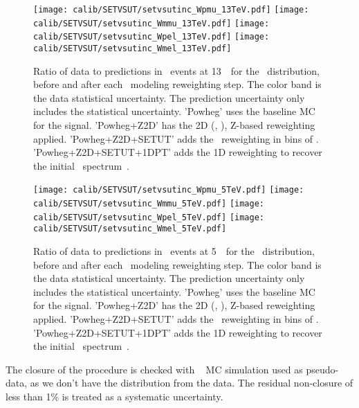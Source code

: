      
     \begin{figure}[pt]
     	\texttt{[image: calib/SETVSUT/setvsutinc\_Wpmu\_13TeV.pdf]}%
     	\texttt{[image: calib/SETVSUT/setvsutinc\_Wmmu\_13TeV.pdf]}
		\texttt{[image: calib/SETVSUT/setvsutinc\_Wpel\_13TeV.pdf]}%
     	\texttt{[image: calib/SETVSUT/setvsutinc\_Wmel\_13TeV.pdf]}
     	\caption{Ratio of data to predictions in
     		\Wmn\ events at 13~\TeV\ for the \setue\ distribution, before and after each \setue\ modeling reweighting step. The color band is the data statistical uncertainty. The prediction uncertainty only includes the statistical uncertainty. 'Powheg' uses the baseline MC for the signal. 'Powheg+Z2D' has the 2D (\setue, \pttruthv), Z-based reweighting applied. 'Powheg+Z2D+SETUT' adds the \setue\ reweighting in bins of \ut. 'Powheg+Z2D+SETUT+1DPT' adds the 1D reweighting to recover the initial \pttruthv\ spectrum~\cite{int_note_hr}.}
     	\label{fig:setCalibDataMCRatio13}
     \end{figure}
     
     
     \begin{figure}[pt]
     	\texttt{[image: calib/SETVSUT/setvsutinc\_Wpmu\_5TeV.pdf]}%
		\texttt{[image: calib/SETVSUT/setvsutinc\_Wmmu\_5TeV.pdf]}
		\texttt{[image: calib/SETVSUT/setvsutinc\_Wpel\_5TeV.pdf]}%
		\texttt{[image: calib/SETVSUT/setvsutinc\_Wmel\_5TeV.pdf]}
     	\caption{Ratio of data to predictions in
     		\Wmn\ events at 5~\TeV\ for the \setue\ distribution, before and after each \setue\ modeling reweighting step. The color band is the data statistical uncertainty. The prediction uncertainty only includes the statistical uncertainty. 'Powheg' uses the baseline MC for the signal. 'Powheg+Z2D' has the 2D (\setue, \pttruthv), Z-based reweighting applied. 'Powheg+Z2D+SETUT' adds the \setue\ reweighting in bins of \ut. 'Powheg+Z2D+SETUT+1DPT' adds the 1D reweighting to recover the initial \pttruthv\ spectrum~\cite{int_note_hr}.}
     	\label{fig:setCalibDataMCRatio5}
     \end{figure}
     
     The closure of the procedure is checked with \Sherpa~ MC simulation used as pseudo-data, as we don't have the \ptv distribution from the data. The residual non-closure of less than 1\% is treated as a systematic uncertainty.
